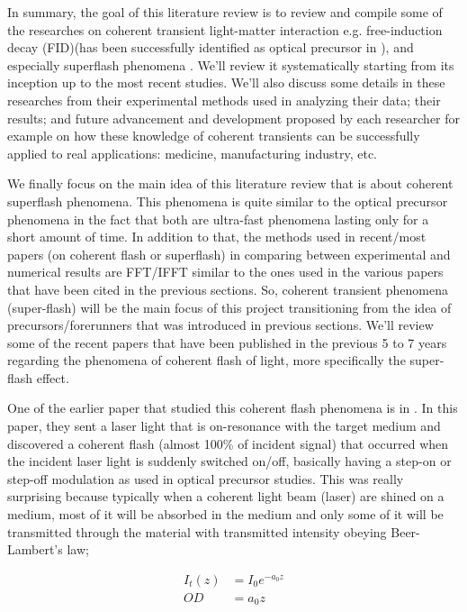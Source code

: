 In summary, the goal of this literature review is to review and compile some of the researches on coherent transient light-matter interaction e.g. free-induction decay (FID)(has been successfully identified as optical precursor in \cite{Chen2010}), and especially superflash phenomena \cite{Kwong2014}. We'll review it systematically starting from its inception up to the most recent studies. We'll also discuss some details in these researches from their experimental methods used in analyzing their data; their results; and future advancement and development proposed by each researcher for example on how these knowledge of coherent transients can be successfully applied to real applications: medicine, manufacturing industry, etc.

We finally focus on the main idea of this literature review that is about coherent superflash phenomena. This phenomena is quite similar to the optical precursor phenomena in the fact that both are ultra-fast phenomena lasting only for a short amount of time. In addition to that, the methods used in recent/most papers (on coherent flash or superflash) in comparing between experimental and numerical results are FFT/IFFT similar to the ones used in the various papers that have been cited in the previous sections. So, coherent transient phenomena (super-flash) will be the main focus of this project transitioning from the idea of precursors/forerunners that was introduced in previous sections. We'll review some of the recent papers that have been published in the previous 5 to 7 years regarding the phenomena of coherent flash of light, more specifically the super-flash effect.

One of the earlier paper that studied this coherent flash phenomena is in \cite{Chalony2011}. In this paper, they sent a laser light that is on-resonance with the target medium and discovered a coherent flash (almost 100\% of incident signal) that occurred when the incident laser light is suddenly switched on/off, basically having a step-on or step-off modulation as used in optical precursor studies. This was really surprising because typically when a coherent light beam (laser) are shined on a medium, most of it will be absorbed in the medium and only some of it will be transmitted through the material with transmitted intensity obeying Beer-Lambert's law;

\begin{align}
    I_{t}(z) &= I_{0} e^{-a_{0} z}\\
    OD &= a_{0} z
\end{align}

